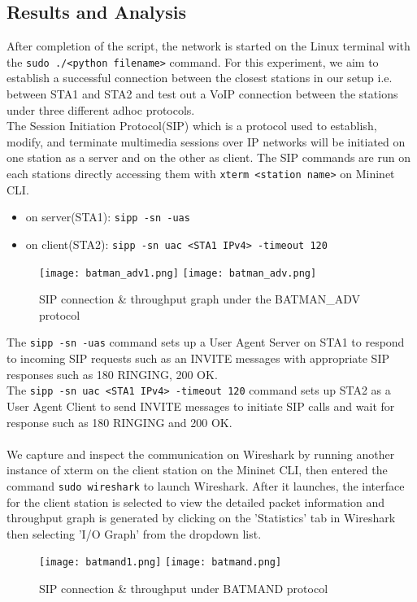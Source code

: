 \documentclass{article}
\begin{document}
\subsection{Results and Analysis}
After completion of the script, the network is started on the Linux terminal with the \texttt{sudo ./<python filename>} command. For this experiment, we aim to establish a successful connection between the closest stations in our setup i.e. between STA1 and STA2 and test out a VoIP connection between the stations under three different adhoc protocols. \\ The Session Initiation Protocol(SIP) which is a protocol used to establish, modify, and terminate multimedia sessions over IP networks will be initiated on one station as a server and on the other as client. The SIP commands are run on each stations directly accessing them with \texttt{xterm <station name>} on Mininet CLI. 
	\begin{itemize}
		\item on server(STA1): \texttt{sipp -sn -uas}
		\item on client(STA2): \texttt{sipp -sn uac <STA1 IPv4> -timeout 120}
	\end{itemize}
	\begin{figure}[h]
        		\centering
        		\texttt{[image: batman\_adv1.png]}
        		\texttt{[image: batman\_adv.png]}		
        		\caption{SIP connection \& throughput graph under the BATMAN\_ADV protocol}
        		\label{fig:t2-2}
    	\end{figure}
The \texttt{sipp -sn -uas} command sets up a User Agent Server on STA1 to respond to incoming SIP requests such as an INVITE messages with appropriate SIP responses such as 180 RINGING, 200 OK. \\ The \texttt{sipp -sn uac <STA1 IPv4> -timeout 120} command sets up STA2 as a User Agent Client to send INVITE messages to initiate SIP calls and wait for response  such as 180 RINGING and 200 OK. \\\\ We capture and inspect the communication on Wireshark by running another instance of xterm on the client station on the Mininet CLI, then entered the command \texttt{sudo wireshark} to launch Wireshark. After it launches, the interface for the client station is selected to view the detailed packet information and throughput graph is generated by clicking on the 'Statistics' tab in Wireshark then selecting 'I/O Graph' from the dropdown list.
    	\begin{figure}[h]
        		\centering
        		\texttt{[image: batmand1.png]}
		\texttt{[image: batmand.png]}
        		\caption{SIP connection \& throughput under BATMAND protocol}
        		\label{fig:t2-3}
    	\end{figure}
\end{document}
